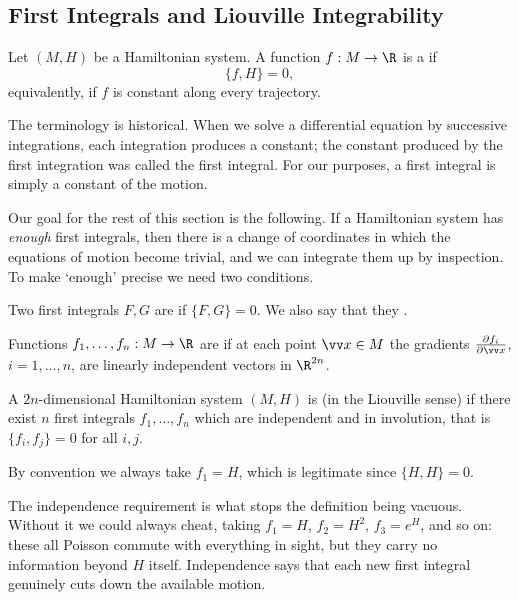 \subsection{First Integrals and Liouville Integrability}

\begin{definition}
	Let $(M, H)$ be a Hamiltonian system. A function $f : M \to \R$ is a  if
	$$
	\{f, H\} = 0,
	$$
	equivalently, if $f$ is constant along every trajectory.
\end{definition}

The terminology is historical. When we solve a differential equation by successive integrations, each integration produces a constant; the constant produced by the first integration was called the first integral. For our purposes, a first integral is simply a constant of the motion.

Our goal for the rest of this section is the following. If a Hamiltonian system has \emph{enough} first integrals, then there is a change of coordinates in which the equations of motion become trivial, and we can integrate them up by inspection. To make `enough' precise we need two conditions.

\begin{definition}[Involution]
	Two first integrals $F, G$ are  if $\{F, G\} = 0$. We also say that they .
\end{definition}

\begin{definition}[Independence]
	Functions $f_1, \dots, f_n : M \to \R$ are  if at each point $\vv x \in M$ the gradients $\frac{\partial f_i}{\partial \vv x}$, $i = 1,\dots, n$, are linearly independent vectors in $\R^{2n}$.
\end{definition}

\begin{definition}
	A $2n$-dimensional Hamiltonian system $(M, H)$ is  (in the Liouville sense) if there exist $n$ first integrals $f_1, \dots, f_n$ which are independent and in involution, that is $\{f_i, f_j\} = 0$ for all $i,j$.
\end{definition}

By convention we always take $f_1 = H$, which is legitimate since $\{H, H\} = 0$.

The independence requirement is what stops the definition being vacuous. Without it we could always cheat, taking $f_1 = H$, $f_2 = H^2$, $f_3 = e^H$, and so on: these all Poisson commute with everything in sight, but they carry no information beyond $H$ itself. Independence says that each new first integral genuinely cuts down the available motion.

